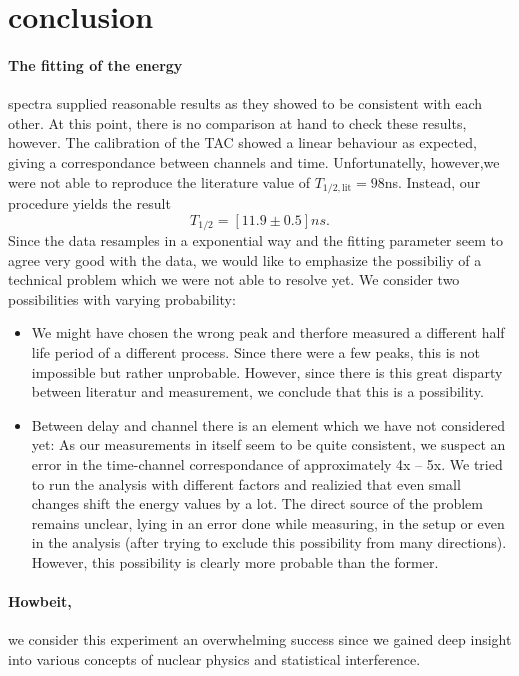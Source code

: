\section{conclusion}
\paragraph{The fitting of the energy}
spectra supplied reasonable results as they showed to be consistent 
with each other. At this point, there is no comparison at hand to check these results, however. 
The calibration of the TAC showed a linear behaviour as expected, giving
a correspondance between channels and time. 
Unfortunatelly, however,we were not able to reproduce the literature value of 
$T_{1/2, \mathrm{lit}}=98$ns. Instead, our procedure yields the result
\begin{equation}
T_{1/2} =\left [11.9 \pm 0.5 \right ] ns .
\end{equation}
Since the data resamples in a exponential way and the fitting parameter seem to agree very good with the data,
we would like to emphasize the possibiliy of a technical problem which we were not able to resolve yet. 
We consider two possibilities with varying probability:
\begin{itemize}
    \item 
        We might have chosen the wrong peak and therfore measured a different half life period of a different 
        process. Since there were a few peaks, this is not impossible but rather unprobable. However, since there
        is this great disparty between literatur and measurement, we conclude that this is a possibility.
    \item 
        Between delay and channel there is an element which we have not considered yet:  
        As our measurements in itself seem to be quite consistent, we suspect an error in the 
        time-channel correspondance of approximately 4x -- 5x. 
        We tried to run the analysis with different factors and realizied that even small changes
        shift the energy values by a lot. 
        The direct source of the problem remains unclear, lying in an error done 
        while measuring, in the setup or even in the analysis (after trying to exclude this 
            possibility from many directions).
        However, this possibility is clearly more probable than the former. 
\end{itemize}
\paragraph{Howbeit,} we consider this experiment an overwhelming success since we gained deep 
insight into various concepts of nuclear physics and statistical interference. 
